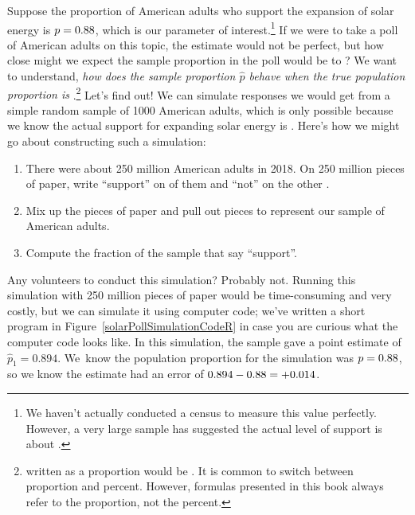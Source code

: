 Suppose the proportion of American adults who support
the expansion of solar energy is $p = 0.88{}$,
which is our parameter of interest.\footnote{We haven't
  actually conducted a census to measure this value perfectly.
  However, a very large sample has suggested the actual
  level of support is about \pewsolarparpercent{}.}
If we were to take a poll of \pewsolarpollsize{} American adults
on this topic, the estimate would not be perfect,
but how close might we expect the sample proportion
in the poll would be to \pewsolarparpercent{}?
We want to understand, \emph{how does the
sample proportion $\hat{p}$ behave when the true population
proportion is
\pewsolarparprop{}}.\footnote{\pewsolarparpercent{}
  written as a proportion would be
  \pewsolarparprop{}.
  It is common to switch between proportion and percent.
  However, formulas presented in this book always refer
  to the proportion, not the percent.}
Let's find out!
We can simulate responses we would get from a simple
random sample of 1000 American adults,
which is only possible because we know the actual
support for expanding solar energy is \pewsolarparprop{}.
%
%
%
Here's how we might go about constructing such a simulation:
\begin{enumerate}
\item There were about 250 million American adults in 2018.
    On 250 million pieces of paper, write ``support''
    on \pewsolarparpercent{} of them and ``not'' on
    the other \pewsolarparpercentcomplement{}.
\item Mix up the pieces of paper and pull out \pewsolarpollsize{}
    pieces to represent our sample of \pewsolarpollsize{}
    American adults.
\item Compute the fraction of the sample that say ``support''.
\end{enumerate}
Any volunteers to conduct this simulation? Probably not. Running
this simulation with 250 million pieces of paper would be
time-consuming and very costly, but we can simulate it
using computer code; we've written a short program in
Figure~\ref{solarPollSimulationCodeR}
in case you are curious what the computer code looks like.
In this simulation, the sample gave a point estimate of
$\hat{p}_1 = 0.894$. We~know the population proportion
for the simulation was $p = 0.88{}$, so we know
the estimate had an error of
$0.894 - 0.88{} = \text{+0.014}$.

